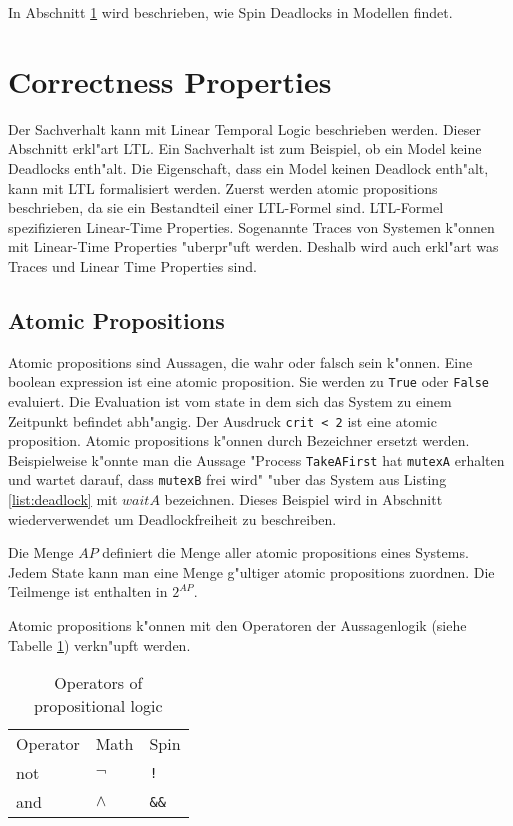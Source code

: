 \documentclass[11pt,twoside,a4paper]{article}
\begin{document}
In Abschnitt \ref{sec:ltl} wird beschrieben, wie Spin Deadlocks in Modellen findet.



\section{Correctness Properties}
\label{sec:ltl}

 Der Sachverhalt kann mit Linear Temporal Logic beschrieben werden. Dieser Abschnitt erkl"art LTL. Ein Sachverhalt ist zum Beispiel, ob ein Model keine Deadlocks enth"alt. Die Eigenschaft, dass ein Model keinen Deadlock enth"alt, kann mit LTL formalisiert werden. Zuerst werden atomic propositions beschrieben, da sie ein Bestandteil einer LTL-Formel sind. LTL-Formel spezifizieren Linear-Time Properties. Sogenannte Traces von Systemen k"onnen mit Linear-Time Properties "uberpr"uft werden. Deshalb wird auch erkl"art was Traces und Linear Time Properties sind.

\subsection{Atomic Propositions}
\label{sec:atomicpropositions}

Atomic propositions sind Aussagen, die wahr oder falsch sein k"onnen. Eine boolean expression ist eine atomic proposition. Sie werden zu \verb|True| oder \verb|False| evaluiert. Die Evaluation ist vom state in dem sich das System zu einem Zeitpunkt befindet abh"angig. Der Ausdruck \verb|crit < 2| ist eine atomic proposition. Atomic propositions k"onnen durch Bezeichner ersetzt werden. Beispielweise k"onnte man die Aussage "Process \verb|TakeAFirst| hat \verb|mutexA| erhalten und wartet darauf, dass \verb|mutexB| frei wird" "uber das 
System aus Listing \ref{list:deadlock} mit $waitA$ bezeichnen. Dieses Beispiel wird in Abschnitt wiederverwendet um Deadlockfreiheit zu beschreiben.

Die Menge $AP$ definiert die Menge aller atomic propositions eines Systems. Jedem State kann man eine Menge g"ultiger atomic propositions zuordnen. Die Teilmenge ist enthalten in $2^{AP}$.
 
Atomic propositions k"onnen mit den Operatoren der Aussagenlogik (siehe Tabelle \ref{tab:operators_of_propositionallogic}) verkn"upft werden.


\begin{table}
  \centering

  \begin{tabular}{l l l}
    Operator & Math & Spin \\
    not & $\neg$ & \verb|!| \\
    and & $\land$ & \verb|&&| \\
  \end{tabular}
  \caption{Operators of propositional logic }
  \label{tab:operators_of_propositionallogic}
\end{table}
\end{document}
